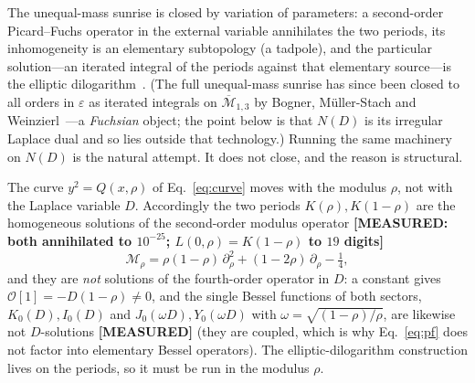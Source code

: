 \documentclass[aps,pra,twocolumn,superscriptaddress,longbibliography]{revtex4-2}
\begin{document}
The unequal-mass sunrise is closed by variation of parameters: a second-order
Picard--Fuchs operator in the external variable annihilates the two periods,
its inhomogeneity is an elementary subtopology (a tadpole), and the particular
solution---an iterated integral of the periods against that elementary
source---is the elliptic dilogarithm~\cite{adamsbognerweinzierl2014,
blochvanhove2015}.  (The full unequal-mass sunrise has since been closed to all
orders in $\varepsilon$ as iterated integrals on $\overline{\mathcal M}_{1,3}$
by Bogner, M\"uller-Stach and Weinzierl~\cite{bognermsw2019}---a \emph{Fuchsian}
object; the point below is that $N(D)$ is its irregular Laplace dual and so lies
outside that technology.)  Running the same machinery on $N(D)$ is the natural
attempt.  It does not close, and the reason is structural.

The curve $y^{2}=Q(x,\rho)$ of Eq.~\eqref{eq:curve} moves with the modulus
$\rho$, not with the Laplace variable $D$.  Accordingly the two periods
$K(\rho),K(1-\rho)$ are the homogeneous solutions of the second-order modulus
operator \textbf{[MEASURED: both annihilated to $10^{-25}$;
$L(0,\rho)=K(1-\rho)$ to $19$ digits]}
%
\begin{equation}
  \mathcal{M}_{\rho}
  = \rho(1-\rho)\,\partial_{\rho}^{2} + (1-2\rho)\,\partial_{\rho}
    - \tfrac14 ,
  \label{eq:modpf}
\end{equation}
%
and they are \emph{not} solutions of the fourth-order operator in
$D$: a constant gives $\mathcal{O}[1]=-D(1-\rho)\neq0$, and the single
Bessel functions of both sectors, $K_{0}(D),I_{0}(D)$ and
$J_{0}(\omega D),Y_{0}(\omega D)$ with $\omega=\sqrt{(1-\rho)/\rho}$, are
likewise not $D$-solutions \textbf{[MEASURED]} (they are coupled, which is why
Eq.~\eqref{eq:pf} does not factor into elementary Bessel operators).  The
elliptic-dilogarithm construction lives on the periods, so it must be run in
the modulus $\rho$.
\end{document}

